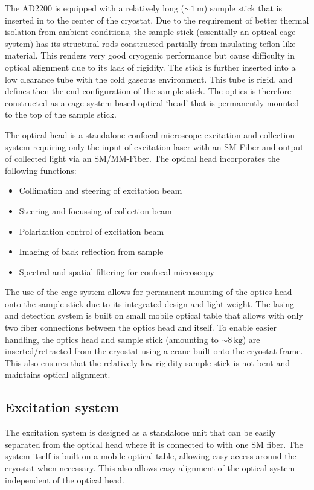 The AD2200 is equipped with a relatively long ($\sim\qty{1}{\meter}$) sample stick that is inserted in to the center of the cryostat. Due to the requirement of better thermal isolation from ambient conditions, the sample stick (essentially an optical cage system) has its structural rods constructed partially from insulating teflon-like material. This renders very good cryogenic performance but cause difficulty in optical alignment due to its lack of rigidity. The stick is further inserted into  a low clearance tube with the cold gaseous  environment. This tube is rigid, and defines then the end configuration of the sample stick. The optics is therefore constructed as a cage system based optical `head' that is permanently mounted to the top of the sample stick.

The optical head is a standalone confocal microscope excitation and collection system requiring only the input of excitation laser with an \gls{SM}-Fiber and output of collected light via an \gls{SM}/\gls{MM}-Fiber. The optical head incorporates the following functions:
\begin{itemize}
    \item Collimation and steering of excitation beam
    \item Steering and focussing of collection beam
    \item Polarization control of excitation beam
    \item Imaging of back reflection from sample
    \item Spectral and spatial filtering for confocal microscopy
\end{itemize}

The use of the cage system allows for permanent mounting of the optics head onto the sample stick due to its integrated design and light weight. The lasing and detection system is built on small mobile optical table that allows with only two fiber connections between the optics head and itself. To enable easier handling, the optics head and sample stick (amounting to $\sim\qty{8}{\kilo\gram}$) are inserted/retracted from the cryostat using a crane built onto the cryostat frame. This also ensures that the relatively low rigidity sample stick is not bent and maintains optical alignment. 

\subsection{Excitation system}

The excitation system is designed as a standalone unit that can be easily separated from the optical head where it is connected to with one \gls{SM} fiber. The system itself is built on a mobile optical table, allowing easy access around the cryostat when necessary. This also allows easy alignment of the optical system independent of the optical head. 

